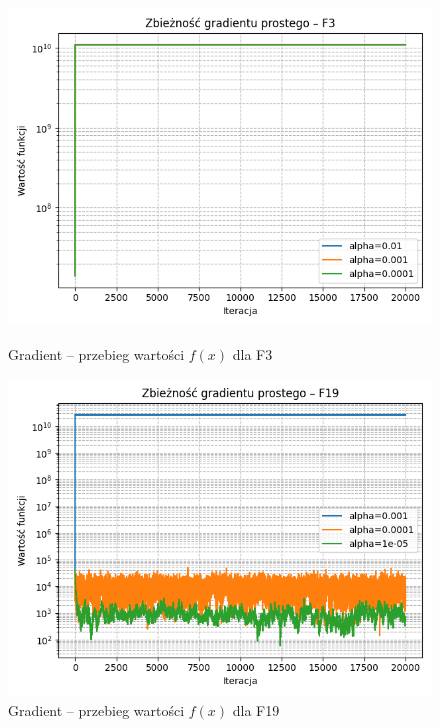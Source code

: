 \documentclass[a4paper]{article}
\begin{document}
\begin{figure}[H]
    \centering
    \begin{minipage}{0.48\linewidth}
        \centering
        \includegraphics[width=\linewidth]{F3_gradient_plot.png}
        \caption{Gradient – przebieg wartości \(f(x)\) dla F3}
        \label{fig:f3grad}
    \end{minipage}
    \hfill
    \begin{minipage}{0.48\linewidth}
        \centering
        \includegraphics[width=\linewidth]{F19_gradient_plot.png}
        \caption{Gradient – przebieg wartości \(f(x)\) dla F19}
        \label{fig:f19grad}
    \end{minipage}
\end{figure}
\end{document}
